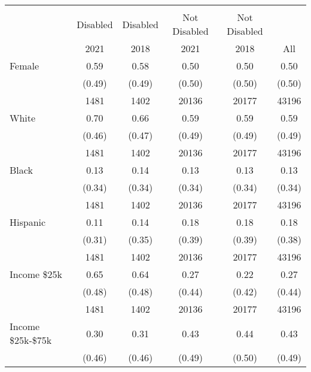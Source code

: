 {
\def\sym#1{\ifmmode^{#1}\else\(^{#1}\)\fi}
\begin{tabular}{l*{5}{c}}
\hline\hline
                    &\multicolumn{5}{c}{}                                            \\
                    &Disabled&Disabled&Not Disabled&Not Disabled&   \\
                    &2021&2018&2021&2018&    All \\   
\hline
Female              &        0.59&        0.58&        0.50&        0.50&        0.50\\
                    &      (0.49)&      (0.49)&      (0.50)&      (0.50)&      (0.50)\\
                    &        1481&        1402&       20136&       20177&       43196\\
White               &        0.70&        0.66&        0.59&        0.59&        0.59\\
                    &      (0.46)&      (0.47)&      (0.49)&      (0.49)&      (0.49)\\
                    &        1481&        1402&       20136&       20177&       43196\\
Black               &        0.13&        0.14&        0.13&        0.13&        0.13\\
                    &      (0.34)&      (0.34)&      (0.34)&      (0.34)&      (0.34)\\
                    &        1481&        1402&       20136&       20177&       43196\\
Hispanic            &        0.11&        0.14&        0.18&        0.18&        0.18\\
                    &      (0.31)&      (0.35)&      (0.39)&      (0.39)&      (0.38)\\
                    &        1481&        1402&       20136&       20177&       43196\\
Income \<\$25k       &        0.65&        0.64&        0.27&        0.22&        0.27\\
                    &      (0.48)&      (0.48)&      (0.44)&      (0.42)&      (0.44)\\
                    &        1481&        1402&       20136&       20177&       43196\\
Income \$25k-\$75k    &        0.30&        0.31&        0.43&        0.44&        0.43\\
                    &      (0.46)&      (0.46)&      (0.49)&      (0.50)&      (0.49)\\

\end{tabular}}
